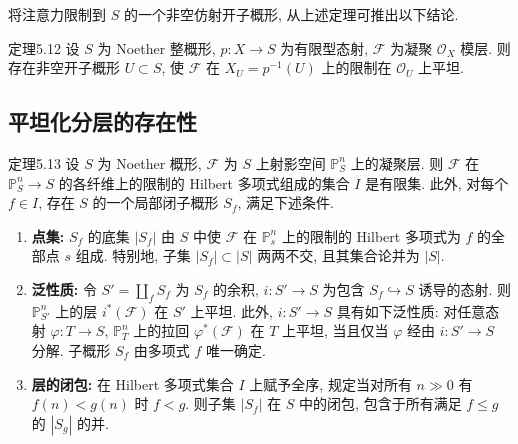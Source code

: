 将注意力限制到 $S$ 的一个非空仿射开子概形, 从上述定理可推出以下结论.
\begin{origstatement}{定理}{5.12}\label{ch05:thm5.12}
设 $S$ 为 Noether 整概形, $p:X\to S$ 为有限型态射, $\mathcal F$ 为凝聚 $\mathcal O_X$ 模层. 则存在非空开子概形 $U\subset S$, 使 $\mathcal F$ 在 $X_U=p^{-1}(U)$ 上的限制在 $\mathcal O_U$ 上平坦.
\end{origstatement}

\subsection{平坦化分层的存在性}\label{ch05:sec5.4.2}
\begin{origstatement}{定理}{5.13}\label{ch05:thm5.13}
设 $S$ 为 Noether 概形, $\mathcal F$ 为 $S$ 上射影空间 $\mathbb P^n_S$ 上的凝聚层. 则 $\mathcal F$ 在 $\mathbb P^n_S\to S$ 的各纤维上的限制的 Hilbert 多项式组成的集合 $I$ 是有限集. 此外, 对每个 $f\in I$, 存在 $S$ 的一个局部闭子概形 $S_f$, 满足下述条件.
\begin{enumerate}
\item[(i)] \textbf{点集:} $S_f$ 的底集 $|S_f|$ 由 $S$ 中使 $\mathcal F$ 在 $\mathbb P^n_s$ 上的限制的 Hilbert 多项式为 $f$ 的全部点 $s$ 组成. 特别地, 子集 $|S_f|\subset|S|$ 两两不交, 且其集合论并为 $|S|$.
\item[(ii)] \textbf{泛性质:} 令 $S'=\coprod_f S_f$ 为 $S_f$ 的余积, $i:S'\to S$ 为包含 $S_f\hookrightarrow S$ 诱导的态射. 则 $\mathbb P^n_{S'}$ 上的层 $i^*(\mathcal F)$ 在 $S'$ 上平坦. 此外, $i:S'\to S$ 具有如下泛性质: 对任意态射 $\varphi:T\to S$, $\mathbb P^n_T$ 上的拉回 $\varphi^*(\mathcal F)$ 在 $T$ 上平坦, 当且仅当 $\varphi$ 经由 $i:S'\to S$ 分解. 子概形 $S_f$ 由多项式 $f$ 唯一确定.
\item[(iii)] \textbf{层的闭包:} 在 Hilbert 多项式集合 $I$ 上赋予全序, 规定当对所有 $n\gg0$ 有 $f(n)<g(n)$ 时 $f<g$. 则子集 $|S_f|$ 在 $S$ 中的闭包, 包含于所有满足 $f\leq g$ 的 $|S_g|$ 的并.
\end{enumerate}
\end{origstatement}
